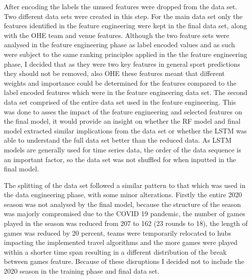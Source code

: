\documentclass{imc-inf}
\begin{document}
	After encoding the labels the unused features were dropped from the data set. Two different data sets were created in this step. For the main data set only the features identified in the feature engineering were kept in the final data set, along with the OHE team and venue features. Although the two feature sets were analysed in the feature engineering phase as label encoded values and as such were subject to the same ranking principles applied in the the feature engineering phase, I decided that as they were two key features in general sport predictions they should not be removed, also OHE these features meant that different weights and importance could be determined for the features compared to the label encoded features which were in the feature engineering data set. The second data set comprised of the entire data set used in the feature engineering. This was done to asses the impact of the feature engineering and selected features on the final model, it would provide an insight on whether the RF model and final model extracted similar implications from the data set or whether the LSTM was able to understand the full data set better than the reduced data. As LSTM models are generally used for time series data, the order of the data sequence is an important factor, so the data set was not shuffled for when inputted in the final model.  	
	\newline
	
	The splitting of the data set followed a similar pattern to that which was used in the data engineering phase, with some minor alterations. Firstly the entire 2020 season was not analysed by the final model, because the structure of the season was majorly compromised due to the COVID 19 pandemic, the number of games played in the season was reduced from 207 to 162 (23 rounds to 18), the length of games was reduced by 20 percent, teams were temporarily relocated to hubs impacting the implemented travel algorithms and the more games were played within a shorter time span resulting in a different distribution of the break between games feature. Because of these disruptions I decided not to include the 2020 season in the training phase and final data set.  
	
\end{document}
